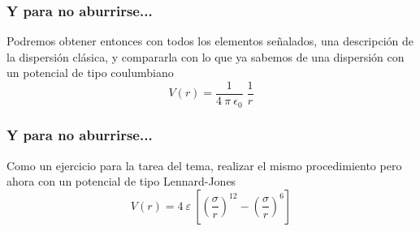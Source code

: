 \begin{frame}
\frametitle{Y para no aburrirse...}
Podremos obtener entonces con todos los elementos señalados, una descripción de la dispersión clásica, y compararla con lo que ya sabemos de una dispersión con un potencial de tipo coulumbiano
\[  V(r) = \dfrac{1}{4 \: \pi \: \epsilon_{0}} \; \dfrac{1}{r}\]
\end{frame}
\begin{frame}
\frametitle{Y para no aburrirse...}
Como un ejercicio para la tarea del tema, realizar el mismo procedimiento pero ahora con un potencial de tipo Lennard-Jones
\[ V(r) = 4 \: \varepsilon \: \left[ \left( \dfrac{\sigma}{r} \right)^{12} - \left( \dfrac{\sigma}{r} \right)^{6} \right] \]
\end{frame}
